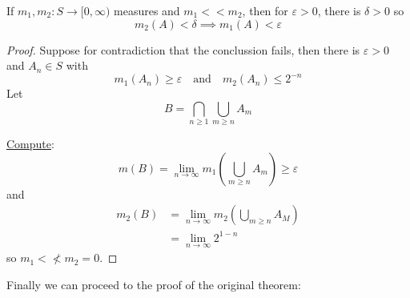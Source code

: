 \begin{lemma}
	If $m_1, m_2 : S \to [0, \infty)$ measures and 
	 $m_1 << m_2$, then for $\varepsilon > 0$, there is $\delta > 0$ so 
	 \[
	 	m_2(A) < \delta \implies m_1 (A) < \varepsilon
	 \] 
\end{lemma}

\begin{proof}
	Suppose for contradiction that the conclussion fails,
	then there is $\varepsilon > 0 $ and $A_n \in S$ with
	\[
		m_1 (A_{n}) \geq \varepsilon \quad \text{and} \quad m_2 (A_n) \leq 2^{-n}
	\] 
	Let 
	\[
		B = \bigcap_{n \geq 1} \bigcup_{m \geq n} A_m
	\] 

	\underline{Compute}:
	\[
		m(B) = \lim_{n \to \infty} m_1 ( \bigcup_{m \geq n} A_m ) \geq \varepsilon
	\] and
	\begin{align*}
		m_2 (B) &= \lim_{n \to \infty} m_2 (\bigcup_{m \geq n} A_M ) \\
				&= \lim_{n \to \infty} 2^{1 - n}
	\end{align*} so $m_1 <\nless m_2 = 0$.
\end{proof}

Finally we can proceed to the proof of the original theorem:


